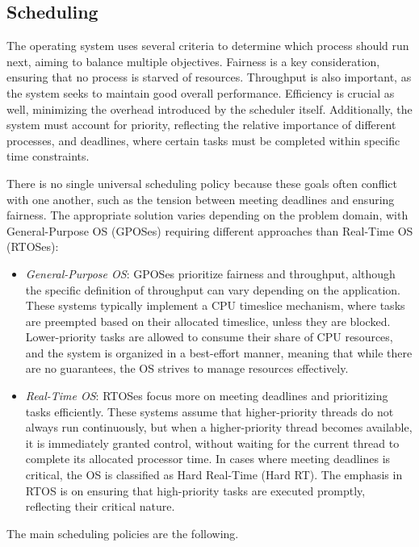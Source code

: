 \subsection{Scheduling}
The operating system uses several criteria to determine which process should run next, aiming to balance multiple objectives. 
Fairness is a key consideration, ensuring that no process is starved of resources. 
Throughput is also important, as the system seeks to maintain good overall performance. 
Efficiency is crucial as well, minimizing the overhead introduced by the scheduler itself. 
Additionally, the system must account for priority, reflecting the relative importance of different processes, and deadlines, where certain tasks must be completed within specific time constraints.

There is no single universal scheduling policy because these goals often conflict with one another, such as the tension between meeting deadlines and ensuring fairness. 
The appropriate solution varies depending on the problem domain, with General-Purpose OS (GPOSes) requiring different approaches than Real-Time OS (RTOSes): 
\begin{itemize}
    \item \textit{General-Purpose OS}: GPOSes prioritize fairness and throughput, although the specific definition of throughput can vary depending on the application. 
        These systems typically implement a CPU timeslice mechanism, where tasks are preempted based on their allocated timeslice, unless they are blocked. 
        Lower-priority tasks are allowed to consume their share of CPU resources, and the system is organized in a best-effort manner, meaning that while there are no guarantees, the OS strives to manage resources effectively.
    \item \textit{Real-Time OS}: RTOSes focus more on meeting deadlines and prioritizing tasks efficiently. 
        These systems assume that higher-priority threads do not always run continuously, but when a higher-priority thread becomes available, it is immediately granted control, without waiting for the current thread to complete its allocated processor time. 
        In cases where meeting deadlines is critical, the OS is classified as Hard Real-Time (Hard RT). 
        The emphasis in RTOS is on ensuring that high-priority tasks are executed promptly, reflecting their critical nature.
\end{itemize}
The main scheduling policies are the following. 

